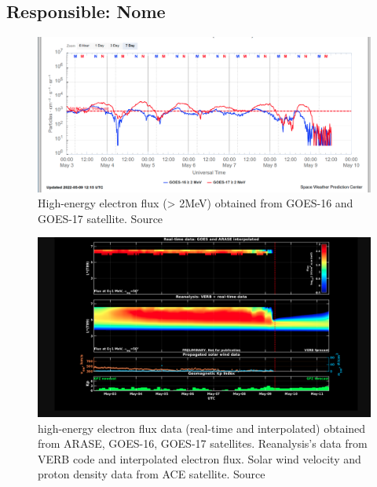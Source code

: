 \documentclass[a4paper, 10pt]{article}
\begin{document}
 \subsection{Responsible: Nome} 
 
\begin{figure}[H]
    
                        \centering
   
                             \includegraphics[width=14cm]{./figures//figureRadBelts_0.png}

                             \caption{ High-energy electron flux (> 2MeV) obtained from GOES-16 and GOES-17 satellite. Source}
                        \end{figure}

                     \begin{figure}[H]
    
                        \centering
   
                             \includegraphics[width=14cm]{./figures//figureRadBelts_1.png}

                             \caption{ high-energy electron flux data (real-time and interpolated) obtained from ARASE, GOES-16, GOES-17 satellites. Reanalysis’s data from VERB code and interpolated electron flux. Solar wind velocity and proton density data from ACE satellite. Source}
                        \end{figure}
\end{document}
